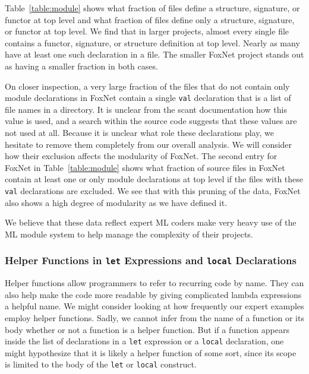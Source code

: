 \documentclass[12pt,abstracton]{scrartcl}
\begin{document}
Table~\ref{table:module} shows what fraction of files define a structure, signature, or functor at top level
and what fraction of files define only a structure, signature, or functor at top level.
We find that in larger projects, almost every single file contains a functor, signature, or structure
definition at top level. Nearly as many have at least one such declaration in a file.
The smaller FoxNet project stands out as having a smaller fraction in both cases.

On closer inspection, a very large fraction of the files that do not contain only module declarations
in FoxNet contain a single \texttt{val} declaration that is a list of file names in a directory. It is unclear
from the scant documentation how this value is used, and a search within the source code
suggests that these values are not used at all.
Because it is unclear what role these declarations play, we hesitate to remove
them completely from our overall analysis. We will consider
how their exclusion affects the modularity of FoxNet.
The second entry for FoxNet in Table~\ref{table:module} shows what
fraction of source files in FoxNet contain at least one or only module declarations at top level
if the files with these \texttt{val} declarations are excluded. We see that
with this pruning of the data, FoxNet also shows a high degree of modularity as we have defined it.

We believe that these data reflect expert ML coders
make very heavy use of the ML module system to help manage the complexity of their projects.
\subsubsection{Helper Functions in \texttt{let} Expressions and \texttt{local} Declarations}\label{subsubsec:let}
Helper functions allow programmers to refer to recurring code by name.
They can also help make the code more readable by giving complicated
lambda expressions a helpful name. We might consider looking at
how frequently our expert examples employ helper functions. Sadly,
we cannot infer from the name of a function or its body whether or not
a function is a helper function. But if a function appears inside
the list of declarations in a \texttt{let} expression or a \texttt{local}
declaration, one might hypothesize that it is likely a helper function
of some sort, since its scope is limited to the body of the \texttt{let}
or \texttt{local} construct.
\end{document}
